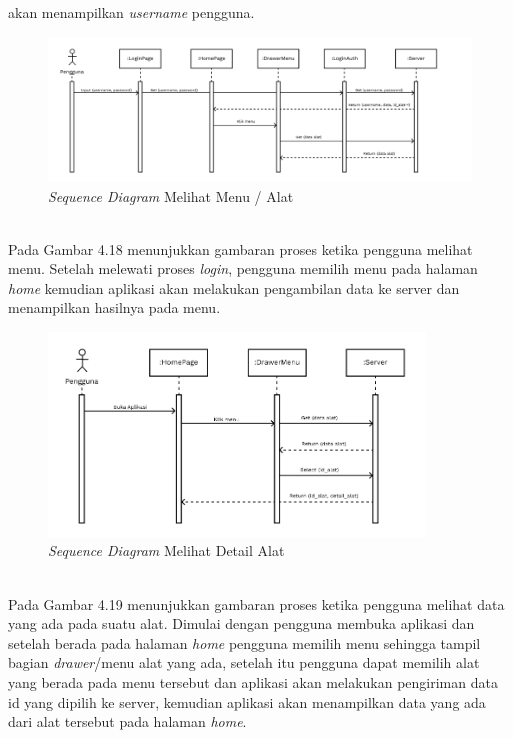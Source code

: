 \begin{flushleft}
\begin{justify}
\begin{enumerate}[label=\alph*.]
            akan menampilkan \emph{username} pengguna.\\
            \begin{figure}[ht]
                \centering
                \includegraphics[width=12cm]{images/bab 4/buka menu alat.png}
                \caption{\textit{Sequence Diagram} Melihat Menu / Alat}
            \end{figure}
            \\Pada Gambar 4.18 menunjukkan gambaran proses ketika pengguna melihat menu. Setelah melewati proses \emph{login}, pengguna memilih menu pada halaman \emph{home} kemudian aplikasi akan melakukan pengambilan data ke server dan menampilkan hasilnya pada menu.
            \begin{figure}[ht]
                \centering
                \includegraphics[width=10cm]{images/bab 4/Sequence buka detail alat.png}
                \caption{\textit{Sequence Diagram} Melihat Detail Alat}
            \end{figure}
            \\Pada Gambar 4.19 menunjukkan gambaran proses ketika pengguna melihat data yang ada pada suatu alat. Dimulai dengan pengguna membuka aplikasi dan setelah berada pada halaman \emph{home} pengguna memilih menu sehingga tampil bagian \emph{drawer}/menu alat yang ada, setelah itu pengguna dapat memilih alat yang berada pada menu tersebut dan aplikasi akan melakukan pengiriman data id yang dipilih ke server, 
            kemudian aplikasi akan menampilkan data yang ada dari alat tersebut pada halaman \emph{home}.
            \vspace{4cm}

\end{enumerate}
\end{justify}
\end{flushleft}
